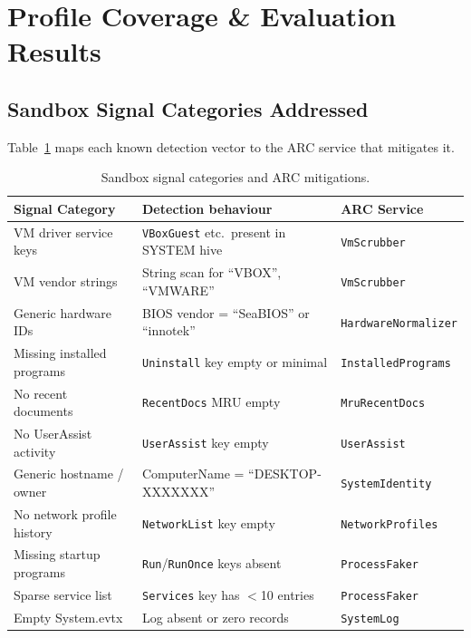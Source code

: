 \documentclass[12pt,a4paper]{article}
\begin{document}
\section{Profile Coverage \& Evaluation Results}
\label{sec:eval}

\subsection{Sandbox Signal Categories Addressed}

Table~\ref{tab:signals} maps each known detection vector to the ARC service
that mitigates it.

\begin{table}[H]
\centering
\small
\caption{Sandbox signal categories and ARC mitigations.}
\label{tab:signals}
\begin{tabularx}{\linewidth}{@{}l X l@{}}
\toprule
\textbf{Signal Category} & \textbf{Detection behaviour} & \textbf{ARC Service} \\
\midrule
VM driver service keys       & \texttt{VBoxGuest} etc.\ present in SYSTEM hive  & \texttt{VmScrubber} \\
VM vendor strings            & String scan for ``VBOX'', ``VMWARE''              & \texttt{VmScrubber} \\
Generic hardware IDs         & BIOS vendor = ``SeaBIOS'' or ``innotek''          & \texttt{HardwareNormalizer} \\
Missing installed programs   & \texttt{Uninstall} key empty or minimal           & \texttt{InstalledPrograms} \\
No recent documents          & \texttt{RecentDocs} MRU empty                     & \texttt{MruRecentDocs} \\
No UserAssist activity       & \texttt{UserAssist} key empty                     & \texttt{UserAssist} \\
Generic hostname / owner     & ComputerName = ``DESKTOP-XXXXXXX''                & \texttt{SystemIdentity} \\
No network profile history   & \texttt{NetworkList} key empty                    & \texttt{NetworkProfiles} \\
Missing startup programs     & \texttt{Run}/\texttt{RunOnce} keys absent         & \texttt{ProcessFaker} \\
Sparse service list          & \texttt{Services} key has $<$10 entries           & \texttt{ProcessFaker} \\
Empty System.evtx            & Log absent or zero records                        & \texttt{SystemLog} \\

\end{tabularx}
\end{table}
\end{document}
